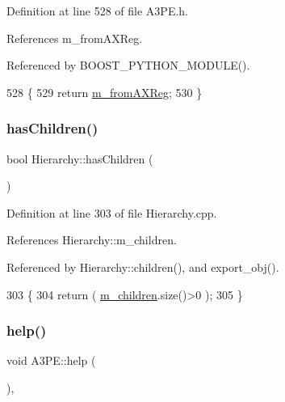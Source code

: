 Definition at line 528 of file A3\+P\+E.\+h.



References m\+\_\+from\+A\+X\+Reg.



Referenced by B\+O\+O\+S\+T\+\_\+\+P\+Y\+T\+H\+O\+N\+\_\+\+M\+O\+D\+U\+L\+E().


\begin{DoxyCode}
528                        \{
529     \textcolor{keywordflow}{return} \hyperlink{classA3PE_acbfe708ac0a81243959c96124f192b9e}{m\_fromAXReg};
530   \}
\end{DoxyCode}
\mbox{\label{classHierarchy_a255174fe4d316d2a3f430dcb9dab29f1}} 
\subsubsection{\texorpdfstring{has\+Children()}{hasChildren()}}
{\footnotesize\ttfamily bool Hierarchy\+::has\+Children (\begin{DoxyParamCaption}{ }\end{DoxyParamCaption})\hspace{0.3cm}{\ttfamily [inherited]}}



Definition at line 303 of file Hierarchy.\+cpp.



References Hierarchy\+::m\+\_\+children.



Referenced by Hierarchy\+::children(), and export\+\_\+obj().


\begin{DoxyCode}
303                               \{
304   \textcolor{keywordflow}{return} ( \hyperlink{classHierarchy_a038816763941fd4a930504917f60483b}{m\_children}.size()>0 );
305 \}
\end{DoxyCode}
\mbox{\label{classA3PE_ae495a413cc26d31321b31942ebef1bfa}} 
\subsubsection{\texorpdfstring{help()}{help()}}
{\footnotesize\ttfamily void A3\+P\+E\+::help (\begin{DoxyParamCaption}{ }\end{DoxyParamCaption})\hspace{0.3cm}{\ttfamily [inline]}, {\ttfamily [virtual]}}

